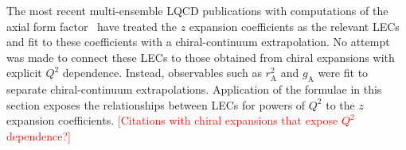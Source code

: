 The most recent multi-ensemble LQCD publications with computations
 of the axial form factor~\cite{Park:2021ypf,RQCD:2019jai}
 have treated the $z$ expansion coefficients as the relevant LECs
 and fit to these coefficients with a chiral-continuum extrapolation.
No attempt was made to connect these LECs to those obtained
 from chiral expansions with explicit $Q^2$ dependence.
Instead, observables such as $r_{\mathrm{A}}^2$ and $g_{\mathrm{A}}$
 were fit to separate chiral-continuum extrapolations.
Application of the formulae in this section exposes the relationships
 between LECs for powers of $Q^2$ to the $z$ expansion coefficients.
\textcolor{red}{[Citations with chiral expansions that expose $Q^2$ dependence?]}
